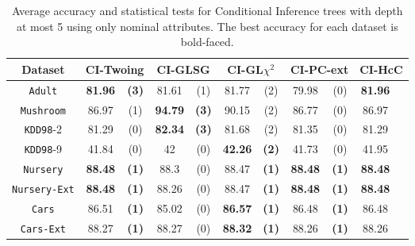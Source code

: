 \begin{table*}
\small
\centering
    \caption{Average accuracy and statistical tests  for  Conditional Inference trees 
with depth at most 5 using only nominal attributes. The best accuracy for each dataset is bold-faced.}
\label{tab:ctree-5}
\begin{tabular}{c|cc|cc|cc|cc|cc} 
Dataset  &   \multicolumn{2}{c|}{CI-Twoing} &   \multicolumn{2}{c|}{CI-GLSG} & \multicolumn{2}{c|}{CI-GL$\chi^2$}& \multicolumn{2}{c|}{CI-PC-ext}& \multicolumn{2}{c}{CI-HcC} \\  \hline   
{\tt Adult}        &{\bf 81.96} &{\bf  (3)} & 81.61       & (1)       & 81.77       & (2)       & 79.98       & (0)       & {\bf 81.96} &           \\
{\tt Mushroom}     &86.97       & (1)       &{\bf  94.79 }& {\bf (3)} & 90.15       & (2)       & 86.77       & (0)       & 86.97       &           \\
{\tt KDD98}-2      &81.29       & (0)       & {\bf 82.34 }& {\bf (3) }& 81.68       & (2)       & 81.35       & (0)       & 81.29       &           \\
{\tt KDD98}-9      &41.84       & (0)       & 42          & (0)       & {\bf 42.26} & {\bf (2)} & 41.73       & (0)       & 41.95       &           \\
{\tt Nursery}      &{\bf 88.48} & {\bf (1)} & 88.3        & (0)       & 88.47       & {\bf (1)} &{\bf 88.48 } & {\bf (1)} & {\bf 88.48} &           \\
{\tt Nursery-Ext}  &{\bf 88.48} & {\bf (1)} & 88.26       & (0)       & 88.47       & {\bf (1)} &{\bf 88.48 } & {\bf (1)} & {\bf 88.48} &           \\
{\tt Cars}         &86.51       & {\bf (1)} & 85.02       & (0)       & {\bf 86.57} & {\bf (1)} & 86.48       & {\bf (1)} & 86.48       &           \\
{\tt Cars-Ext}     &88.27       & {\bf (1) }& 88.27       & (0)       & {\bf 88.32} & {\bf (1)} & 88.26       & {\bf (1)} & 88.26       &           \\

\end{tabular}
\end{table*}
